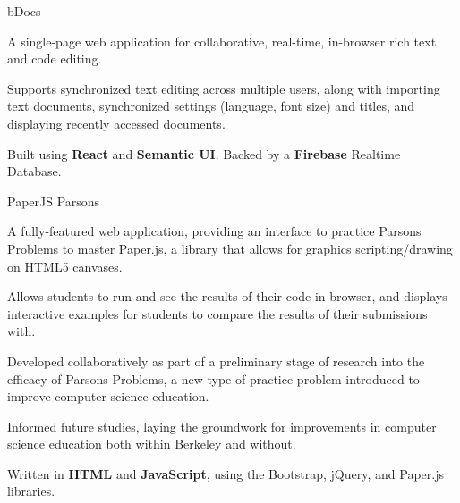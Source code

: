 

\begin{cventries}

  \cventry
    {} %
    {bDocs} %
    {} %
    {} %
    {
      \vspace{-9mm}
      \begin{cvprojectitems}
        \item A single-page web application for collaborative, real-time, in-browser rich text and code editing.
        \item Supports synchronized text editing across multiple users, along with importing text documents, synchronized settings (language, font size) and titles, and displaying recently accessed documents.
        \item Built using \textbf{React} and \textbf{Semantic UI}. Backed by a \textbf{Firebase} Realtime Database. 
      \end{cvprojectitems}
    }

  \vspace{-3mm}
  \cventry
    {} %
    {PaperJS Parsons} %
    {} %
    {} %
    {
      \begin{cvprojectitems}
        \vspace{-9mm}
        \item A fully-featured web application, providing an interface to practice Parsons Problems to master Paper.js, a library that allows for graphics scripting/drawing on HTML5 canvases.
        \item Allows students to run and see the results of their code in-browser, and displays interactive examples for students to compare the results of their submissions with.
        \item Developed collaboratively as part of a preliminary stage of research into the efficacy of Parsons Problems, a new type of practice problem introduced to improve computer science education.
        \item Informed future studies, laying the groundwork for improvements in computer science education both within Berkeley and without.
        \item Written in \textbf{HTML} and \textbf{JavaScript}, using the Bootstrap, jQuery, and Paper.js libraries.
      \end{cvprojectitems}
    }
\end{cventries}
